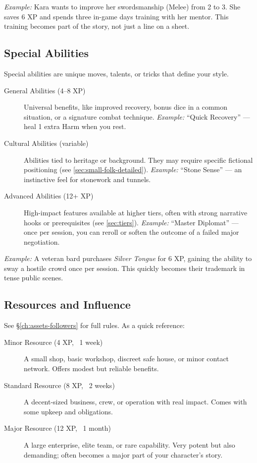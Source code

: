 \medskip
\noindent\textit{Example:} Kara wants to improve her swordsmanship (Melee) from 2 to 3.  
She saves 6 XP and spends three in-game days training with her mentor. This
training becomes part of the story, not just a line on a sheet.

\subsection{Special Abilities}
Special abilities are unique moves, talents, or tricks that define your style.

\begin{description}
  \item[General Abilities (4--8 XP)]  
    Universal benefits, like improved recovery, bonus dice in a common
    situation, or a signature combat technique.  
    \emph{Example:} ``Quick Recovery'' --- heal 1 extra Harm when you rest.

  \item[Cultural Abilities (variable)]  
    Abilities tied to heritage or background. They may require specific
    fictional positioning (see \ref{sec:small-folk-detailed}).  
    \emph{Example:} ``Stone Sense'' --- an instinctive feel for stonework and tunnels.

  \item[Advanced Abilities (12+ XP)]  
    High-impact features available at higher tiers, often with strong narrative
    hooks or prerequisites (see \ref{sec:tiers}).  
    \emph{Example:} ``Master Diplomat'' --- once per session, you can reroll or
    soften the outcome of a failed major negotiation.
\end{description}

\emph{Example:} A veteran bard purchases \emph{Silver Tongue} for 6 XP,
gaining the ability to sway a hostile crowd once per session. This quickly
becomes their trademark in tense public scenes.

\subsection{Resources and Influence}
See \S\ref{ch:assets-followers} for full rules. As a quick reference:

\begin{description}
  \item[Minor Resource (4 XP, ~1 week)]  
    A small shop, basic workshop, discreet safe house, or minor contact
    network. Offers modest but reliable benefits.

  \item[Standard Resource (8 XP, ~2 weeks)]  
    A decent-sized business, crew, or operation with real impact. Comes with
    some upkeep and obligations.

  \item[Major Resource (12 XP, ~1 month)]  
    A large enterprise, elite team, or rare capability. Very potent but also
    demanding; often becomes a major part of your character's story.
\end{description}

